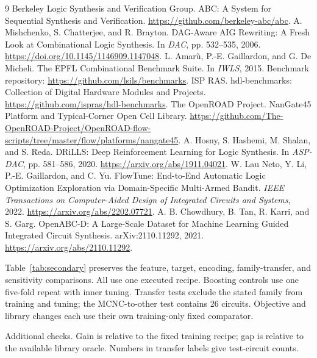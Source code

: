 \documentclass[11pt,a4paper]{article}
\makeatletter
\renewcommand\section{\@startsection{section}{1}{\z@}{1.3em}{.4em}{\normalfont\large\bfseries}}
\newenvironment{inlinetable}{\par\addvspace{12pt}\noindent\begin{minipage}{\textwidth}\def\@captype{table}\centering\small}{\end{minipage}\par\addvspace{12pt}}
\makeatother
\begin{document}
\begin{thebibliography}{9}\small
{} Berkeley Logic Synthesis and Verification Group. ABC: A System for Sequential Synthesis and Verification. \url{https://github.com/berkeley-abc/abc}.
 A. Mishchenko, S. Chatterjee, and R. Brayton. DAG-Aware AIG Rewriting: A Fresh Look at Combinational Logic Synthesis. In \emph{DAC}, pp. 532--535, 2006. \url{https://doi.org/10.1145/1146909.1147048}.
 L. Amar\`u, P.-E. Gaillardon, and G. De Micheli. The EPFL Combinational Benchmark Suite. In \emph{IWLS}, 2015. Benchmark repository: \url{https://github.com/lsils/benchmarks}.
 ISP RAS. hdl-benchmarks: Collection of Digital Hardware Modules and Projects. \url{https://github.com/ispras/hdl-benchmarks}.
 The OpenROAD Project. NanGate45 Platform and Typical-Corner Open Cell Library. \url{https://github.com/The-OpenROAD-Project/OpenROAD-flow-scripts/tree/master/flow/platforms/nangate45}.
 A. Hosny, S. Hashemi, M. Shalan, and S. Reda. DRiLLS: Deep Reinforcement Learning for Logic Synthesis. In \emph{ASP-DAC}, pp. 581--586, 2020. \url{https://arxiv.org/abs/1911.04021}.
 W. Lau Neto, Y. Li, P.-E. Gaillardon, and C. Yu. FlowTune: End-to-End Automatic Logic Optimization Exploration via Domain-Specific Multi-Armed Bandit. \emph{IEEE Transactions on Computer-Aided Design of Integrated Circuits and Systems}, 2022. \url{https://arxiv.org/abs/2202.07721}.
 A. B. Chowdhury, B. Tan, R. Karri, and S. Garg. OpenABC-D: A Large-Scale Dataset for Machine Learning Guided Integrated Circuit Synthesis. arXiv:2110.11292, 2021. \url{https://arxiv.org/abs/2110.11292}.
\end{thebibliography}

\appendix
\section{Additional Experiment Results}
\label{app:checks}

Table~\ref{tab:secondary} preserves the feature, target, encoding, family-transfer, and sensitivity comparisons. All use one executed recipe. Boosting controls use one five-fold repeat with inner tuning. Transfer tests exclude the stated family from training and tuning; the MCNC-to-other test contains 26 circuits. Objective and library changes each use their own training-only fixed comparator.

\begin{inlinetable}

\caption{Additional checks. Gain is relative to the fixed training recipe; gap is relative to the available library oracle. Numbers in transfer labels give test-circuit counts.}
\label{tab:secondary}
\end{inlinetable}
\end{document}
